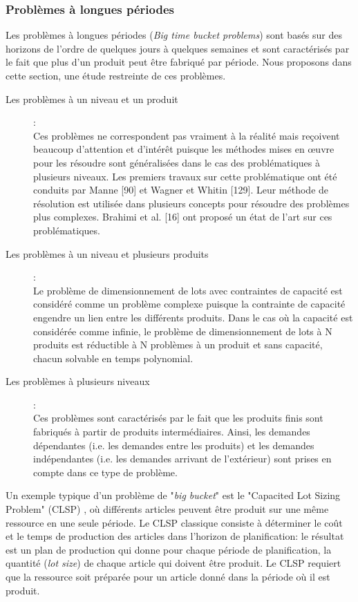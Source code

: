 \documentclass[12pt,a4paper]{article}
\begin{document}
	\subsubsection{Problèmes à longues périodes}
	Les problèmes à longues périodes (\emph{Big time bucket problems}) sont basés sur des
horizons de l'ordre de quelques jours à quelques semaines et sont caractérisés par le fait que plus d'un produit peut être fabriqué par période. Nous proposons dans cette section, une étude restreinte de ces problèmes.
	
	\begin{description}
		\item[Les problèmes à un niveau et un produit]: \\
		Ces problèmes ne correspondent pas vraiment à la réalité mais reçoivent beaucoup d'attention et d'intérêt puisque les méthodes mises en œuvre pour les résoudre sont généralisées dans le cas des problématiques à plusieurs niveaux.
		Les premiers travaux sur cette problématique ont été conduits par Manne [90]
et Wagner et Whitin [129]. Leur méthode de résolution est utilisée dans plusieurs
concepts pour résoudre des problèmes plus complexes. Brahimi et al. [16] ont proposé
un état de l'art sur ces problématiques.		
		\item[Les problèmes à un niveau et plusieurs produits]: \\
		Le problème de dimensionnement de lots avec contraintes de capacité est considéré comme un problème complexe puisque la contrainte de capacité engendre un
lien entre les différents produits. Dans le cas où la capacité est considérée comme
infinie, le problème de dimensionnement de lots à N produits est réductible à N
problèmes à un produit et sans capacité, chacun solvable en temps polynomial.
		\item[Les problèmes à plusieurs niveaux]: \\ 
		Ces problèmes sont caractérisés par le fait que les produits finis sont fabriqués à partir de produits intermédiaires. Ainsi, les demandes dépendantes (i.e. les demandes entre les produits) et les demandes indépendantes (i.e. les demandes arrivant de l'extérieur) sont prises en compte dans ce type de problème.
	\end{description}
	
	Un exemple typique d'un problème de "\emph{big bucket}" est le "Capacited Lot Sizing Problem" (CLSP) , où différents articles peuvent être produit sur une même ressource en une seule période. Le CLSP classique consiste à déterminer le coût et le temps de production des articles dans l'horizon de planification: le résultat est un plan de production qui donne pour chaque période de planification, la quantité (\emph{lot size}) de chaque article qui doivent être produit. Le CLSP requiert que la ressource soit préparée pour un article donné dans la période où il est produit. 
	
\end{document}
